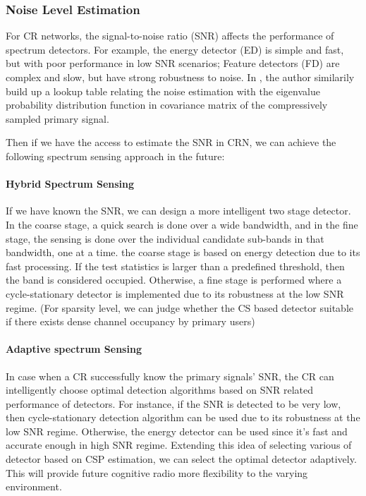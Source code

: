 \subsubsection{Noise Level Estimation}

For CR networks, the signal-to-noise ratio (SNR) affects the performance of spectrum detectors. For example, the energy detector (ED) is simple and fast, but with poor performance in low SNR scenarios; Feature detectors (FD) are complex and slow, but have strong robustness to noise. In \cite{sharma2014compressive_snr}, the author similarily build up a lookup table relating the noise estimation with the eigenvalue probability distribution function in covariance matrix of the compressively sampled primary signal. 

Then if we have the access to estimate the SNR in CRN, we can achieve the following spectrum sensing approach in the future: 

\paragraph{Hybrid Spectrum Sensing} 

If we have known the SNR, we can design a more intelligent two stage detector. In the coarse stage, a quick search is done over a wide bandwidth, and in the fine stage, the sensing is done over the individual candidate sub-bands in that bandwidth, one at a time. the coarse stage is based on energy detection due to its fast processing. If the test statistics is larger than a predefined threshold, then the band is considered occupied. Otherwise, a fine stage is performed where a cycle-stationary detector is implemented due to its robustness at the low SNR regime. (For sparsity level, we can judge whether the CS based detector suitable if there exists dense channel occupancy by primary users)

\paragraph{Adaptive spectrum Sensing} 

In case when a CR successfully know the primary signals' SNR, the CR can intelligently choose optimal detection algorithms based on SNR related performance of detectors. For instance, if the SNR is detected to be very low, then cycle-stationary detection algorithm can be used due to its robustness at the low SNR regime. Otherwise, the energy detector can be used since it's fast and accurate enough in high SNR regime. Extending this idea of selecting various of detector based on CSP estimation, we can select the optimal detector adaptively. This will provide future cognitive radio more flexibility to the varying environment.

